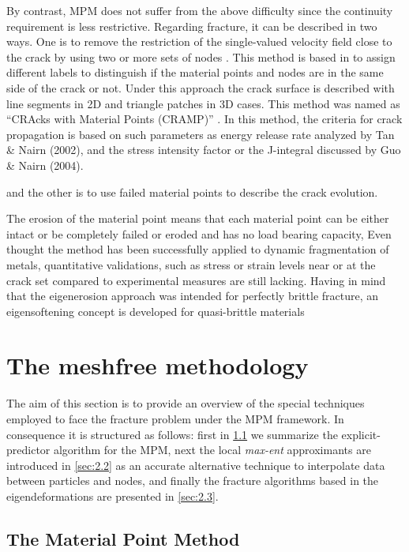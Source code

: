 \documentclass[preprint,12pt,a4paper]{elsarticle}
\begin{document}
By contrast, MPM does not suffer from the above difficulty since the
continuity requirement is less restrictive. Regarding fracture, it can
be described in two ways. One is to remove the restriction of the single-valued velocity field close to the crack by using two or
more sets of nodes \cite{Nairn_2006}. This method is based in to
assign different labels to distinguish if the material points and
nodes are in the same side of the crack or not. Under this approach
the crack surface is described with line segments in 2D and triangle
patches in 3D cases. This method was named as ``CRAcks with Material
Points (CRAMP)'' \cite{Nairn_2003}. In this method, the criteria for
crack propagation is based on such parameters as energy release rate
analyzed by Tan \& Nairn (2002)\cite{Nairn_2002}, and the stress
intensity factor or the J-integral discussed by Guo \& Nairn
(2004)\cite{Nairn_2004}.

and the other is to use failed material points to
describe the crack evolution.

The erosion of the material point means that each material point can
be either intact or be completely failed or eroded and has no load
bearing capacity, Even thought the method has been successfully
applied to dynamic fragmentation of metals, quantitative validations,
such as stress or strain levels near or at the crack set compared to
experimental measures are still lacking. Having in mind that the
eigenerosion approach was intended for perfectly brittle fracture, an
eigensoftening concept is developed for quasi-brittle materials



\section{The meshfree methodology}
\label{sec:2}

The aim of this section is to provide an overview of the special
techniques employed to face the fracture problem under the MPM
framework. In consequence it is structured as follows: first in
\ref{sec:2.1} we summarize the explicit-predictor algorithm for the
MPM, next the local \textit{max-ent} approximants are introduced in
\ref{sec:2.2} as an accurate alternative technique to interpolate data
between particles and nodes, and finally the fracture algorithms based
in the eigendeformations are presented in \ref{sec:2.3}.

\subsection{The Material Point Method}
\label{sec:2.1}
\end{document}
